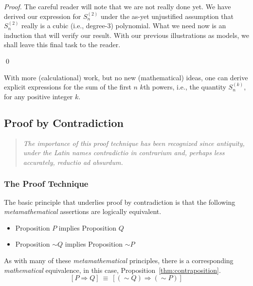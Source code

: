 \begin{proof}
\medskip

The careful reader will note that we are not really done yet.  We
have derived our expression for $S^{(2)}_n$ under the as-yet
unjustified assumption that $S^{(2)}_n$ really is a cubic (i.e.,
degree-$3$) polynomial.  What we need now is an induction that will
verify our result.  With our previous illustrations as models, we
shall leave this final task to the reader.

\qed
\end{proof}

With more (calculational) work, but no new (mathematical) ideas, one
can derive explicit expressions for the sum of the first $n$ $k$th
powers, i.e., the quantity $S^{(k)}_n$, for any positive integer $k$.


\subsection{Proof by Contradiction}
\label{sec:Contradiction}

\begin{quote}
{\em The importance of this proof technique has been recognized since
  antiquity, under the Latin names {\em contradictio in contrarium}
  and, perhaps less accurately, {\em reductio ad absurdum}.}
\end{quote}



\subsubsection{The Proof Technique}
\label{sec:contradiction-technique}



The basic principle that underlies proof by contradiction is that the
following {\em metamathematical} assertions are logically equivalent.
\begin{itemize}
\item
Proposition $P$ {\sc implies} Proposition $Q$
\item
Proposition $\sim Q$ {\sc implies} Proposition $\sim P$
\end{itemize}

As with many of these {\em metamathematical} principles, there is a
corresponding {\em mathematical} equivalence, in this case,
Proposition~\ref{thm:contraposition}.
\[ [P \Rightarrow Q] \ \equiv \ [(\sim Q) \Rightarrow (\sim P)] \]



